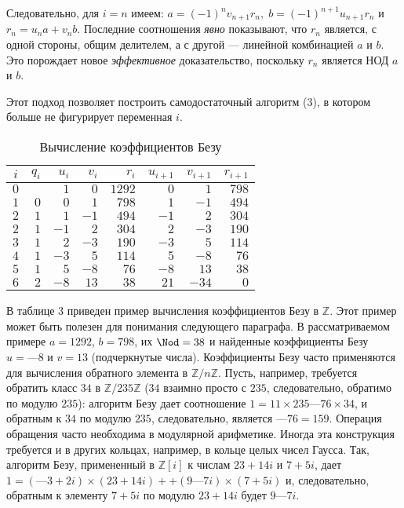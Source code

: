 Следовательно, для $i=n$ имеем: $a=(-1)^nv_{n+1}r_{n},\;b=(-1)^{n+1}u_{n+1}r_{n}$ и $r_{n}=u_{n}a+v_{n}b$. Последние соотношения \textit{явно} показывают, что $r_{n}$ является, с одной стороны, общим делителем, а с другой — линейной
комбинацией $a$ и $b$. Это порождает новое \textit{эффективное} доказательство,
поскольку $r_{n}$ является НОД $a$ и $b$.

Этот подход позволяет построить самодостаточный алгоритм (3),
в котором больше не фигурирует переменная $i$.
\begin{table}[h!]
\centering
\begin{tabular}{|c|rrrrrrr|}
\hline
$i$ & $q_{i}$ & $u_{i}$ & $v_{i}$ & $r_{i}$ & $u_{i+1}$ & $v_{i+1}$ & $r_{i+1}$ \\ \hline
$0$ &            & $1$        & $0$        & $1292$     & $0$          & $1$          & $798$        \\
$1$ & $0$        & $0$        & $1$        & $798$      & $1$          & $-1$         & $494$        \\
$2$ & $1$        & $1$        & $-1$       & $494$      & $-1$         & $2$          & $304$        \\
$2$ & $1$        & $-1$       & $2$        & $304$      & $2$          & $-3$         & $190$        \\
$3$ & $1$        & $2$        & $-3$       & $190$      & $-3$         & $5$          & $114$        \\
$4$ & $1$        & $-3$       & $5$        & $114$      & $5$          & $-8$         & $76$         \\
$5$ & $1$        & $5$        & $-8$       & $76$       & $-8$         & $13$         & $38$         \\
$6$ & $2$        & \underline{$-8$}       & \underline{$13$}       & \underline{$38$}       & $21$         & $-34$        & $0$          \\ \hline
\end{tabular}
\caption{Вычисление коэффициентов Безу}
\end{table}

В таблице 3 приведен пример вычисления коэффициентов Безу в $\mathbb{Z}$. Этот пример может быть полезен для понимания следующего парагра­фа. В рассматриваемом примере $a = 1292$, $b = 798$, их $\Nod = 38$ и найденные коэффициенты Безу $u = — 8$ и $v = 13$ (подчеркнутые числа).
\newpage
Коэффициенты Безу часто применяются для вычисления обратного элемента в $\mathbb{Z} /n\mathbb{Z}$. Пусть, например, требуется обратить класс $34$ в $\mathbb{Z}/235\mathbb{Z}$ ($34$ \linebreak
взаимно просто с $235$, следовательно, обратимо по модулю $235$): алгоритм Безу дает соотношение $1 = 11\times235 — 76\times34$, и
обратным к $34$ по модулю $235$, следовательно, является $—76 = 159$. Опе­рация обращения часто необходима в модулярной арифметике. Иногда эта конструкция требуется и в других кольцах, например, в кольце целых чисел Гаусса. Так, алгоритм Безу, примененный в $\mathbb{Z}[i]$ к числам $23 + 14i$ и $7 + 5i$, дает $1=(—3 + 2i)\times(23+14i)+$\linebreak$+(9—7i)\times(7+5i)$ и, сле­довательно, обратным к элементу $7 + 5i$ по модулю $23+14i$ будет $9—7i$.
